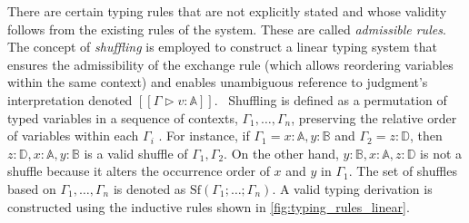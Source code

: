 There are certain typing rules that are not explicitly stated and whose validity follows from the existing rules of the system. These are called \emph{admissible rules}.
The concept of \emph{shuffling} is employed to construct a linear typing system that ensures the admissibility of the exchange rule (which allows reordering variables within the same context) and enables unambiguous reference to judgment's interpretation denoted $[\![ \Gamma \triangleright v: \mathbb{A} ]\!]$.  Shuffling is defined as a permutation of typed variables in a sequence of contexts, $\Gamma_1, \ldots, \Gamma_n$, preserving the relative order of variables within each $\Gamma_i$ \cite{shulman2019practical}. For instance, if $\Gamma_1=x:\mathbb{A}, y:\mathbb{B}$ and $\Gamma_2=z:\mathbb{D}$, then $z:\mathbb{D}, x:\mathbb{A}, y:\mathbb{B}$ is a valid shuffle of $\Gamma_1, \Gamma_2$. On the other hand, $y:\mathbb{B}, x:\mathbb{A}, z:\mathbb{D}$ is not a shuffle because it alters the occurrence order of $x$ and $y$ in $\Gamma_1$. The set of shuffles based on $\Gamma_1, \ldots, \Gamma_n$ is denoted as $\text{Sf} (\Gamma_1; \ldots; \Gamma_n)$. A valid typing derivation is constructed using the inductive rules shown in \autoref{fig:typing_rules_linear}.

